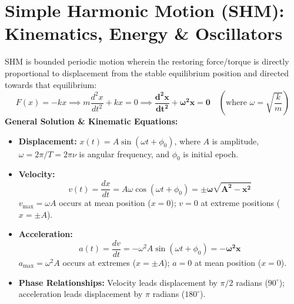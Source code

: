 \documentclass[10pt,a4paper]{article}
\begin{document}
\section{Simple Harmonic Motion (SHM): Kinematics, Energy \& Oscillators}

\begin{conceptbox}
SHM is bounded periodic motion wherein the restoring force/torque is directly proportional to displacement from the stable equilibrium position and directed towards that equilibrium:
\begin{equation}
  F(x) = -k x \implies m \frac{d^2 x}{dt^2} + k x = 0 \implies \mathbf{\frac{d^2 x}{dt^2} + \omega^2 x = 0} \quad \left(\text{where } \omega = \sqrt{\frac{k}{m}}\right)
\end{equation}
\textbf{General Solution \& Kinematic Equations:}
\begin{itemize}
  \item \textbf{Displacement:} $x(t) = A \sin(\omega t + \phi_0)$, where $A$ is amplitude, $\omega = 2\pi/T = 2\pi\nu$ is angular frequency, and $\phi_0$ is initial epoch.
  \item \textbf{Velocity:}
  \begin{equation}
    v(t) = \frac{dx}{dt} = A\omega \cos(\omega t + \phi_0) = \mathbf{\pm \omega \sqrt{A^2 - x^2}}
  \end{equation}
  $v_{\max} = \omega A$ occurs at mean position ($x=0$); $v=0$ at extreme positions ($x = \pm A$).
  \item \textbf{Acceleration:}
  \begin{equation}
    a(t) = \frac{dv}{dt} = -\omega^2 A \sin(\omega t + \phi_0) = \mathbf{-\omega^2 x}
  \end{equation}
  $a_{\max} = \omega^2 A$ occurs at extremes ($x = \pm A$); $a=0$ at mean position ($x=0$).
  \item \textbf{Phase Relationships:} Velocity leads displacement by $\pi/2$ radians ($90^\circ$); acceleration leads displacement by $\pi$ radians ($180^\circ$).
\end{itemize}
\end{conceptbox}
\end{document}
